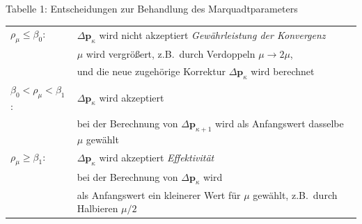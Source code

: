 Tabelle 1: Entscheidungen zur Behandlung des Marquadtparameters

\begin{tabular}{ll}
\hline\hline
$\rho_{\mu} \le \beta_0 $: &
$\Delta \mathbf{p}_\kappa$ wird nicht akzeptiert \textsl{Gewährleistung der Konvergenz} \\
 & $\mu$ wird vergrößert, z.B.\ durch Verdoppeln  $\mu \rightarrow 2 \mu$,\\
 & und die neue zugehörige Korrektur $\Delta \mathbf{p}_\kappa$ wird berechnet\\
\hline
$\beta_0 < \rho_{\mu} < \beta_1$: & $\Delta \mathbf{p}_\kappa$ wird akzeptiert \\
 & bei der Berechnung von $\Delta \mathbf{p}_{\kappa+1}$
  wird als Anfangswert dasselbe $\mu$ gewählt \\ 
\hline
$\rho_{\mu} \ge \beta_1$: & $\Delta \mathbf{p}_\kappa$ wird akzeptiert \textsl{Effektivität}\\
 & bei der Berechnung  von $\Delta \mathbf{p}_\kappa$ wird \\ 
 & als Anfangswert ein kleinerer Wert für $\mu$ gewählt, z.B.\ durch Halbieren $\mu / 2$ \\
\hline\hline
\end{tabular}

